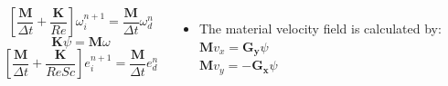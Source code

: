 \begin{frame}
\begin{columns}[c]
\vspace{-1cm}
\begin{center}
\begin{equation*}
 \left[ \frac{\mathbf{M}}{\Delta t} + \frac{\mathbf{K}}{Re} \right] \omega_{i}^{n+1} = \frac{\mathbf{M}}{\Delta t} \omega_{d}^{n}
\end{equation*}
\medskip
\begin{equation*}
 \mathbf{K} \psi = \mathbf{M} \omega
\end{equation*}
\medskip
\begin{equation*}
 \left[ \frac{\mathbf{M}}{\Delta t} + \frac{\mathbf{K}}{ReSc} \right] e_{i}^{n+1} = \frac{\mathbf{M}}{\Delta t} e_{d}^{n}
\end{equation*}
\end{center}

\vspace{0.5cm}
\begin{itemize}
\justifying
\item The material velocity field is calculated by: \\
$\mathbf{M} v_{x} = \mathbf{G_{y}} \psi$\\
$\mathbf{M} v_{y} = - \mathbf{G_{x}} \psi$
\end{itemize}
\end{columns}

\end{frame}






